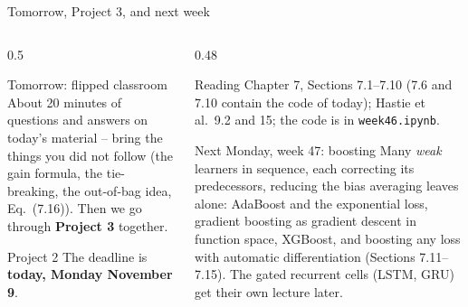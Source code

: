 \documentclass[10pt,aspectratio=169]{beamer}
\begin{document}
\begin{frame}{Tomorrow, Project 3, and next week}
\begin{columns}[T]
\begin{column}{0.5\textwidth}
\begin{block}{Tomorrow: flipped classroom}
About 20 minutes of questions and answers on today's material -- bring the
things you did not follow (the gain formula, the tie-breaking, the
out-of-bag idea, Eq.\ (7.16)).  Then we go through \textbf{Project 3}
together.
\end{block}
\begin{block}{Project 2}
The deadline is \textbf{today, Monday November 9}.
\end{block}
\end{column}
\begin{column}{0.48\textwidth}
\begin{block}{Reading}
Chapter 7, Sections 7.1--7.10 (7.6 and 7.10 contain the code of today);
Hastie et al.\ 9.2 and 15; the code is in \texttt{week46.ipynb}.
\end{block}
\begin{block}{Next Monday, week 47: boosting}
Many \emph{weak} learners in sequence, each correcting its predecessors,
reducing the bias averaging leaves alone: AdaBoost and the exponential
loss, gradient boosting as gradient descent in function space, XGBoost, and
boosting any loss with automatic differentiation (Sections 7.11--7.15).
The gated recurrent cells (LSTM, GRU) get their own lecture later.
\end{block}
\end{column}
\end{columns}
\end{frame}
\end{document}
